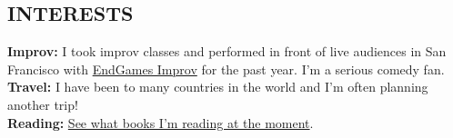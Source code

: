 \documentclass[margin, 10pt]{res}
\begin{document}
\begin{resume}

\section{INTERESTS}
{\bf Improv:} I took improv classes and performed in front of live audiences in San Francisco with \href{http://endgamesimprov.com/}{EndGames Improv} for the past year. I'm a serious comedy fan. \\
{\bf Travel:} I have been to many countries in the world and I'm often planning another trip! \\
{\bf Reading:} \href{http://www.goodreads.com/user/show/55900995-sean-mcqueen}{See what books I'm reading at the moment}. \\


\end{resume}
\end{document}
